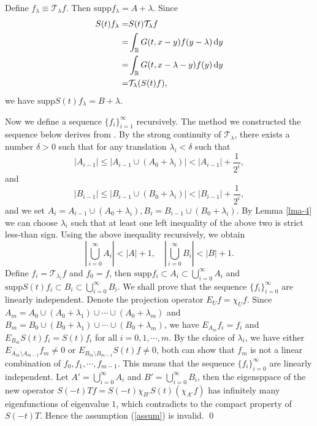 \documentclass[12pt]{amsart}
\def\d{{\,\rm d}}
\theoremstyle{definition}
\numberwithin{equation}{section}
\begin{document}
Define $f_{\lambda}\equiv \mathcal{T}_{\lambda}f$. Then $\mathrm{supp}f_\lambda=A+\lambda$. Since
\begin{align*}
  S(t)f_\lambda=& S(t)\mathcal{T}_{\lambda}f\\
  =& \int_{\mathbb{R}}G(t,x-y)f(y-\lambda) \d y\\
  =&  \int_{\mathbb{R}} G(t,x-\lambda-y)f(y)\d y\\
  =& \mathcal{T}_{\lambda}(S(t)f),
\end{align*} 
we have $\mathrm{supp}S(t)f_\lambda= B+\lambda$.

Now we define a sequence $\{f_i\}_{i=1}^{\infty}$ recursively. The method we constructed the sequence below derives from \cite{Amrein}. By the strong continuity of $\mathcal{T}_{\lambda}$, there exists a number $\delta>0$ such that for any translation $\lambda_i<\delta$ such that
$$
|A_{i-1}|\le |A_{i-1}\cup (A_0+\lambda_i)|<|A_{i-1}|+\frac{1}{2^i},
$$ 
and
$$
|B_{i-1}|\le |B_{i-1}\cup (B_0+\lambda_i)|<|B_{i-1}|+\frac{1}{2^i},
$$ 
and we set $A_i=A_{i-1}\cup  (A_0+\lambda_i), B_i=B_{i-1}\cup (B_0+\lambda_i)$. By Lemma \ref{lma-4} we can choose $\lambda_i$  such that at least one left inequality of the above two is strict less-than sign. Using the above inequality recursively, we obtain
$$
|\bigcup_{i=0}^{\infty}A_i|<|A|+1,\quad |\bigcup_{i=0}^{\infty}B_i|<|B|+1.
$$
Define $f_i=\mathcal{T}_{\lambda_i}f$ and $f_0=f$, then $\mathrm{supp}f_i\subset A_i\subset \bigcup_{i=0}^{\infty}A_i$ and $\mathrm{supp}S(t)f_i\subset B_i\subset \bigcup_{i=0}^{\infty}B_i$. We shall prove that the sequence $\{ f_i\}_{i=0}^{\infty}$ are linearly independent. Denote the projection operator $E_{U}f=\chi_{U}f$. Since $A_m=A_0\cup  (A_0+\lambda_1)\cup\cdots \cup  (A_0+\lambda_m)$ and $B_m=B_0\cup  (B_0+\lambda_1)\cup \cdots \cup (B_0+\lambda_m )$, we have $E_{A_m}f_i=f_i$ and $E_{B_m}S(t)f_i=S(t)f_i$ for all $i=0,1,\cdots,m$. By the choice of $\lambda_i$, we have either $E_{A_m\setminus A_{m-1}}f_m\neq 0$ or $E_{B_m\setminus B_{m-1}}S(t)f\neq 0$, both can show that $f_m$ is not a linear combination of $f_0,f_1,\cdots,f_{m-1}$. This means that the sequence $\{f_i\}_{i=0}^{\infty}$ are linearly independent. Let $A'=\bigcup_{i=0}^{\infty}A_i$ and $B'=\bigcup_{i=0}^{\infty}B_i$, then the eigensppace of the new operator $S(-t)Tf=S(-t)\chi_{B'}S(t)(\chi_{A'}f)$  has infinitely many eigenfunctions of eigenvalue $1$, which contradicts to the compact property of $S(-t)T$. Hence the assumption  (\ref{assum}) is invalid. \qed
\end{document}
